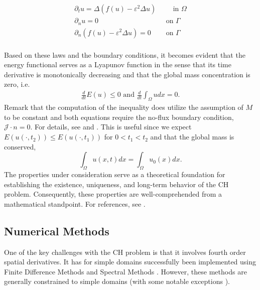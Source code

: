 \begin{equation}
\label{eq:strongch}
    \begin{split}
\partial _{t} u  = \Delta ( f( u)  - \varepsilon ^2 \Delta u ) &\quad \text{ in } \Omega  \\
\partial _{n} u = 0 \quad &\text{ on } \Gamma  \\
\partial _{n}(f( u)  - \varepsilon ^2 \Delta u )  = 0 \quad &\text{ on } \Gamma  \\
    \end{split}
\end{equation}

Based on these laws and the boundary conditions, it becomes evident that the energy functional serves as a Lyapunov function in the sense that its time derivative is monotonically decreasing and that the global mass concentration is zero, i.e.
\[
    \begin{split}
\frac{d}{dt} E( u)  \le  0 \text{ and }\frac{d}{dt} \int_{\Omega }^{}  u dx = 0.
    \end{split}
\]
Remark that the computation of the inequality does utilize the assumption of $M$ to be constant and both equations require the no-flux boundary condition, $\mathcal{J} \cdot n = 0$.
For details, see \cite[Equation 17 ]{lee2014physical} and \cite[Equation 1.7]{garcke2020weak}.
This is useful since we expect $E( u( \cdot , t_{2}) ) \le  E( u( \cdot , t_{1}) ) $ for $0 < t_{1} < t_{2} $ and that the global mass is conserved, \[
\int_{\Omega }^{} u ( x,t)  dx = \int_{\Omega }^{} u_{0}(x)  dx.
\]
The properties under consideration serve as a theoretical foundation for establishing the existence, uniqueness, and long-term behavior of the CH problem. Consequently, these properties are well-comprehended from a mathematical standpoint. For
references, see \cite{abels2007convergence, cherfils2011cahn, elliott1986cahn}.

\subsection{Numerical Methods}%
\label{sub:numerical_methods}

One of the key challenges with the CH problem is that it involves fourth order spatial derivatives. It has for simple domains successfully been implemented using Finite Difference Methods \cite{furihata2001stable,
cheng2019energy} and Spectral Methods \cite{liu2003phase, he2009class}. However, these methods are generally constrained to simple domains (with some notable exceptions \cite{li2013conservative, shen2009efficient, feng2009fourier}).

